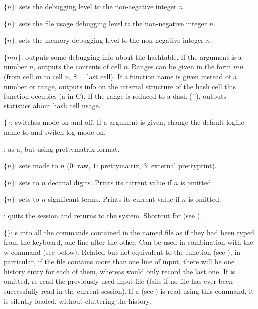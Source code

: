  $\{n\}$: sets the debugging level  to the
non-negative integer $n$.

 $\{n\}$: sets the file usage debugging level 
to the non-negative integer $n$.

 $\{n\}$: sets the memory debugging level 
to the non-negative integer $n$.

 $\{m$\kbd{-}$n\}$: outputs some debugging info about the
hashtable. If the argument is a number $n$, outputs the contents of cell
$n$. Ranges can be given in the form $m$\kbd{-}$n$ (from cell $m$ to cell
$n$, \$ = last cell). If a function name is given instead of a number or
range, outputs info on the internal structure of the hash cell this
function occupies (a  in C). If the range is reduced to
a dash ('\kbd{-}'), outputs statistics about hash cell usage.

 $\{$$\}$: switches  mode on and off.
If a  argument is given, change the default logfile name to
 and switch log mode on.

: as \b{a}, but using prettymatrix format.

 $\{n\}$: sets  mode to $n$ ($0$: raw, $1$:
prettymatrix, $3$: external prettyprint).

 $\{n\}$: sets  to $n$ decimal
digits. Prints its current value if $n$ is omitted.

 $\{n\}$: sets  to $n$ significant terms.
Prints its current value if $n$ is omitted.

: quits the  session and returns to the system.
Shortcut for \kbd{()} (see ).

 $\{$$\}$: s into  all the
commands contained in the named file as if they had been typed from the
keyboard, one line after the other. Can be used in combination with the \b{w}
command (see below). Related but not equivalent to the function 
(see ); in particular, if the file contains more than one
line of input, there will be one history entry for each of them, whereas
 would only record the last one. If  is omitted,
re-read the previously used input file (fails if no file has ever been
successfully read in the current session). If a  
(see ) is read using this command, it is silently loaded,
without cluttering the history.


